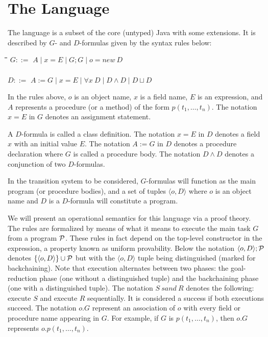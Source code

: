 \documentclass[letter]{ieice}
\newcommand{\sep}{\;\vert\;}
\newcommand{\Pscr}{{\cal P}}
\newcommand{\all}{\forall}
\newenvironment{exmple}{
 \begingroup \begin{tabbing} \hspace{2em}\= \hspace{3em}\= \hspace{3em}\=
\hspace{3em}\= \hspace{3em}\= \hspace{3em}\= \kill}{
 \end{tabbing}\endgroup}
\newcommand{\lb}{\langle}
\newcommand{\rb}{\rangle}
\newcommand{\add}{\sqcup} \newcommand{\adc}{\&} \newcommand{\Cscr}{{\cal C}}
\begin{document}
\section{The Language}\label{sec:logic}

The language is a subset of the core (untyped) Java
 with some extensions. It is described
by $G$- and $D$-formulas given by the syntax rules below:
\begin{exmple}
\>$G ::=$ \>   $A \sep x = E \sep  G;G \sep o = new\ D$ \\   \\
\>$D ::=$ \>  $ A := G  \sep x = E \sep \all x\ D \sep D \land D \sep D \add D$\\

\end{exmple}
\noindent
In the rules above,  $o$ is an object name, $x$ is a field name, $E$ is an expression, and
$A$  represents a procedure (or a method) of the form $p(t_1,\ldots,t_n)$.
The notation $x = E$ in $G$ denotes an assignment statement.

A $D$-formula  is called a class definition. The notation
$x = E$ in $D$ denotes a field $x$ with an initial
value $E$. The notation
$A := G$ in $D$ denotes a procedure declaration where $G$ is called a procedure body.
The notation $D\land D$ denotes a conjunction of two $D$-formulas.

In the transition system to be considered, $G$-formulas will function as the
main program (or procedure bodies), and a set of tuples $\lb o,D\rb$ where $o$ is an object
name and $D$ is a $D$-formula will constitute  a program.

 We will  present an operational
semantics for this language via a proof theory. The rules  are formalized by means of what
it means to
execute the main task $G$ from a program $\Pscr$.
These rules in fact depend on the top-level
constructor in the expression,  a property known as
uniform provability\cite{MNPS91}. Below the notation $\lb o,D\rb;\Pscr$ denotes
$\{ \lb o,D\rb \} \cup \Pscr$ but with the $\lb o,D\rb$ tuple being distinguished
(marked for backchaining). Note that execution  alternates between
two phases: the goal-reduction phase (one  without a distinguished tuple)
and the backchaining phase (one with a distinguished tuple).
The notation $S\ sand\ R$ denotes the following: execute $S$ and execute
$R$ sequentially. It is considered a success if both executions succeed.
The notation  $o.G$ represent an association of $o$ with every field or procedure
name appearing in $G$.
For example, if $G$ is $p(t_1,\ldots,t_n)$, then $o.G$  represents  $o.p (t_1,\ldots,t_n)$.
\end{document}
